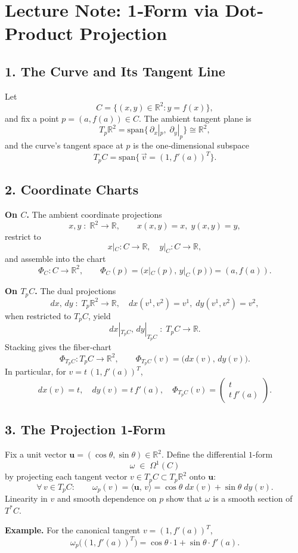 \documentclass[12pt]{article}
\newcommand{\R}{\mathbb{R}}
\begin{document}
	
	\section*{Lecture Note: 1‐Form via Dot‐Product Projection}
	
	\subsection*{1. The Curve and Its Tangent Line}
	Let 
	\[
	C = \bigl\{(x,y)\in\mathbb{R}^2:y = f(x)\bigr\},
	\]
	and fix a point \(p = (a,f(a))\in C\).  The ambient tangent plane is 
	\[
	T_p\mathbb{R}^2 = \mathrm{span}\{\,\partial_x|_p,\;\partial_y|_p\}
	\cong\mathbb{R}^2,
	\]
	and the curve’s tangent space at \(p\) is the one‐dimensional subspace
	\[
	T_pC = \mathrm{span}\bigl\{\,\vec v=(1,f'(a))^T\bigr\}.
	\]
	
	\subsection*{2. Coordinate Charts}
	\textbf{On \(C\).}  The ambient coordinate projections 
	\[
	x,y\;\colon\;\mathbb{R}^2\to\mathbb{R},\qquad
	x(x,y)=x,\;y(x,y)=y,
	\]
	restrict to 
	\[
	x|_C\colon C\to\mathbb{R},\quad
	y|_C\colon C\to\mathbb{R},
	\]
	and assemble into the chart
	\[
	\Phi_C\colon C \to \mathbb{R}^2,\qquad
	\Phi_C(p)=\bigl(x|_C(p),\,y|_C(p)\bigr)=(a,f(a)).
	\]
	
	\medskip
	\textbf{On \(T_pC\).}  The dual projections 
	\[
	dx,\,dy\;\colon\;T_p\mathbb{R}^2\to\mathbb{R},
	\quad
	dx(v^1,v^2)=v^1,\;
	dy(v^1,v^2)=v^2,
	\]
	when restricted to \(T_pC\), yield
	\[
	dx|_{T_pC},\,dy|_{T_pC}
	\;\colon\;T_pC\to\mathbb{R}.
	\]
	Stacking gives the fiber‐chart
	\[
	\Phi_{T_pC}\colon T_pC\to\mathbb{R}^2,
	\qquad
	\Phi_{T_pC}(v)
	=\bigl(dx(v),\,dy(v)\bigr).
	\]
	In particular, for \(v=t\,(1,f'(a))^T\),
	\[
	dx(v)=t,
	\quad
	dy(v)=t\,f'(a),
	\quad
	\Phi_{T_pC}(v)=\begin{pmatrix}t\\t\,f'(a)\end{pmatrix}.
	\]
	
	\subsection*{3. The Projection 1‐Form}
	Fix a unit vector 
	\(\displaystyle \mathbf{u}=(\cos\theta,\sin\theta)\in\mathbb{R}^2.\)
	Define the differential \(1\)-form
	\[
	\omega\;\in\;\Omega^1(C)
	\]
	by projecting each tangent vector \(v\in T_pC\subset T_p\R^2\) onto \(\mathbf{u}\):
	\[
	\forall\,v\in T_pC:\qquad
	\omega_p(v)
	=\langle \mathbf{u},\,v\rangle
	=\cos\theta\;dx(v)
	+\sin\theta\;dy(v).
	\]
	Linearity in \(v\) and smooth dependence on \(p\) show that \(\omega\) is a smooth
	section of \(T^*C\).
	
	\medskip
	\textbf{Example.}  For the canonical tangent \(v=(1,f'(a))^T\),
	\[
	\omega_p\bigl((1,f'(a))^T\bigr)
	=\cos\theta\cdot1
	+\sin\theta\cdot f'(a).
	\]
	
\end{document}
